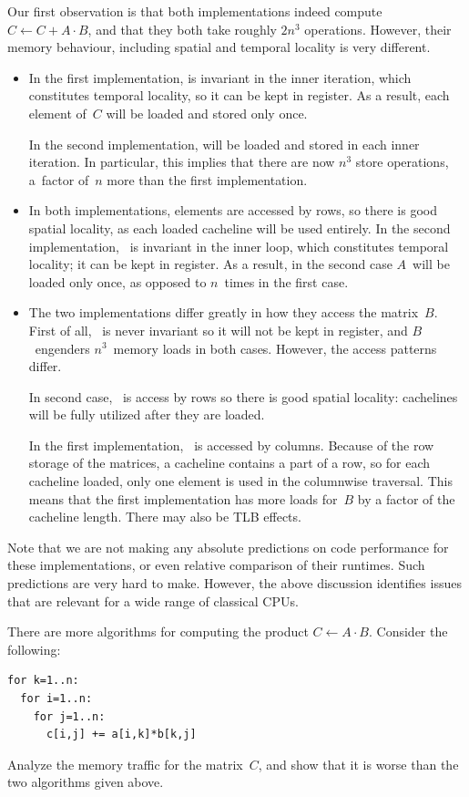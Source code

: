 Our first observation is that both implementations
indeed compute $C\leftarrow
C+A\cdot B$, and that they both take roughly $2n^3$
operations. However, their memory behaviour, including spatial and
temporal locality is very different.
\begin{itemize}
\item[\n{c[i,j]}] In the first implementation,  is
  invariant in the inner iteration, which constitutes temporal
  locality,
  so it can be kept in register. As
  a result, each element of~$C$ will be loaded and stored only once.

  In the second implementation,  will be loaded and stored
  in each inner iteration. In particular, this implies that there are
  now $n^3$ store operations, a~factor of~$n$ more than the first
  implementation.
\item[\n{a[i,k]}] In both implementations,  elements are
  accessed by rows, so there is good spatial locality, as each loaded
  cacheline will be used entirely. In the second implementation,
  ~is invariant in the inner loop, which constitutes
  temporal locality; it can be kept in register. As a result, in the
  second case $A$~will be loaded only once, as opposed to $n$~times in
  the first case.
\item[\n{b[k,j]}] The two implementations differ greatly in how they
  access the matrix~$B$. First of all, ~is never invariant
  so it will not be kept in register, and $B$~engenders $n^3$~memory
  loads in both cases. However, the access patterns differ.

  In second case, ~is access by rows
  so there is good spatial locality: cachelines will be fully utilized
  after they are loaded. 

  In the first implementation, ~is accessed by
  columns. Because of the row storage of the matrices, a cacheline contains
  a part of a row, so for each cacheline loaded, only one element is
  used in the columnwise traversal. This means that the first
  implementation has more loads for~$B$ by a factor of the cacheline
  length. There may also be TLB effects.
\end{itemize}
Note that we are not making any absolute predictions on code
performance for these implementations, or even relative comparison of
their runtimes. Such predictions are very hard to make. However, the
above discussion identifies issues that are relevant for a wide range
of classical \acp{CPU}.

\begin{exercise}
  There are more algorithms for computing the product $C\leftarrow
  A\cdot B$. Consider the following:
\begin{verbatim}
for k=1..n:
  for i=1..n:
    for j=1..n:
      c[i,j] += a[i,k]*b[k,j]
\end{verbatim}
Analyze the memory traffic for the matrix~$C$, and show that it is
worse than the two algorithms given above.
\end{exercise}

